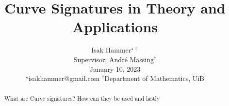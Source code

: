 \documentclass[10pt,conference]{IEEEtran}
\title{ {\Large \textbf{Curve Signatures in Theory and Applications }} }
\begin{document}
\author{
Isak Hammer$^{\star\dagger}$  \\
{\small Supervisor: André Massing$^{\dagger} $  } \\
{\small  January 10, 2023}\\
{\footnotesize $^\star$isakhammer@gmail.com }
{\footnotesize $^\dagger$Department of Mathematics, UiB}\\
}

\maketitle
\begin{sloppy}

\begin{abstract}
    What are Curve signatures? How can they be used and lastly
\end{abstract}

    
    
    

    \printbibliography
\end{sloppy}
\end{document}
